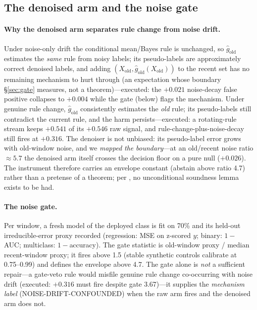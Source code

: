 \documentclass[10pt]{article} %
\begin{document}
\subsection{The denoised arm and the noise gate}\label{sec:denoised}

\paragraph{Why the denoised arm separates rule change from noise drift.} Under noise-only drift the
conditional mean/Bayes rule is unchanged, so $\hat{g}_{\text{old}}$ estimates the \emph{same} rule from noisy labels;
its pseudo-labels are approximately correct denoised labels, and adding $(X_{\text{old}}, \hat{g}_{\text{old}}(X_{\text{old}}))$
to the recent set has no remaining mechanism to hurt through (an expectation whose boundary
\S\ref{sec:gate} measures, not a theorem)---executed: the $+0.021$ noise-decay false positive
collapses to $+0.004$ while the gate (below) flags the mechanism. Under genuine rule change,
$\hat{g}_{\text{old}}$ consistently estimates the \emph{old} rule; its pseudo-labels still contradict the current
rule, and the harm persists---executed: a rotating-rule stream keeps $+0.541$ of its $+0.546$ raw
signal, and rule-change-plus-noise-decay still fires at $+0.316$. The denoiser is not unbiased:
its pseudo-label error grows with old-window noise, and we \emph{mapped the boundary}---at an
old/recent noise ratio $\approx 5.7$ the denoised arm itself crosses the decision floor on a pure null
($+0.026$). The instrument therefore carries an envelope constant (abstain above ratio 4.7) rather
than a pretense of a theorem; per \citet{loog2019minimizers}, no unconditional soundness lemma exists to
be had.

\paragraph{The noise gate.} Per window, a fresh model of the deployed class is fit on 70\% and its
held-out irreducible-error proxy recorded (regression: MSE on z-scored $y$; binary: $1-$AUC;
multiclass: $1-$accuracy). The gate statistic is old-window proxy / median recent-window proxy;
it fires above 1.5 (stable synthetic controls calibrate at 0.75--0.99) and defines the envelope
above 4.7. The gate alone is \emph{not} a sufficient repair---a gate-veto rule would misfile genuine
rule change co-occurring with noise drift (executed: $+0.316$ must fire despite gate 3.67)---it
supplies the \emph{mechanism label} (NOISE-DRIFT-CONFOUNDED) when the raw arm fires and the denoised
arm does not.
\end{document}
